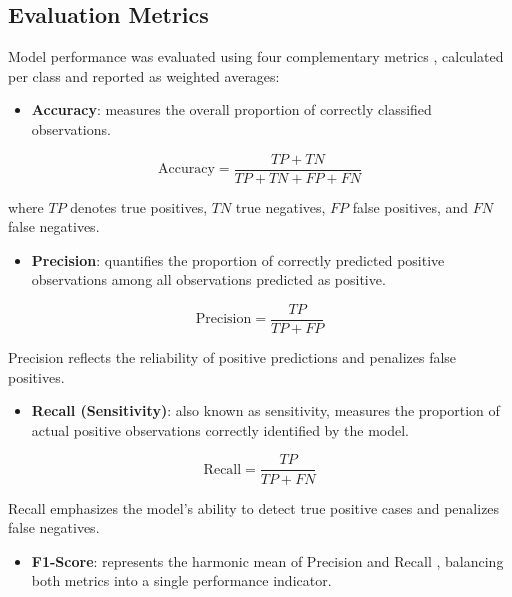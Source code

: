 \documentclass[alpha-refs,english]{RBCA_v3.0}
\begin{document}
\subsection{Evaluation Metrics}
Model performance was evaluated using four complementary metrics \citep{Sokolova2009,VanRijsbergen1979}, calculated per class and reported as weighted averages:

\begin{itemize}
    \item \textbf{Accuracy}: measures the overall proportion of correctly classified observations.
\end{itemize}

\begin{equation}
\mathrm{Accuracy} = \frac{TP + TN}{TP + TN + FP + FN}
\label{eq:accuracy}
\end{equation}

\noindent where $TP$ denotes true positives, $TN$ true negatives, $FP$ false positives, and $FN$ false negatives.

\begin{itemize}
    \item \textbf{Precision}: quantifies the proportion of correctly predicted positive observations among all observations predicted as positive.
\end{itemize}

\begin{equation}
\mathrm{Precision} = \frac{TP}{TP + FP}
\label{eq:precision}
\end{equation}

Precision reflects the reliability of positive predictions and penalizes false positives.

\begin{itemize}
    \item \textbf{Recall (Sensitivity)}: also known as sensitivity, measures the proportion of actual positive observations correctly identified by the model.
\end{itemize}

\begin{equation}
\mathrm{Recall} = \frac{TP}{TP + FN}
\label{eq:recall}
\end{equation}

Recall emphasizes the model's ability to detect true positive cases and penalizes false negatives.

\begin{itemize}
    \item \textbf{F1-Score}: represents the harmonic mean of Precision and Recall \citep{Christen2024}, balancing both metrics into a single performance indicator.
\end{itemize}
\end{document}
